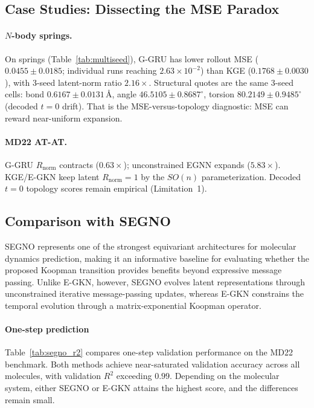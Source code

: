 \documentclass{article}
\newcommand{\GKE}{\textsc{KGE}}
\newcommand{\EGKN}{\textsc{E-GKN}}
\newcommand{\EGNN}{\textsc{EGNN}}
\newcommand{\GGRU}{\textsc{G-GRU}}
\begin{document}
\subsection{Case Studies: Dissecting the MSE Paradox}
\label{sec:mse_paradox}

\paragraph{$N$-body springs.} On springs (Table~\ref{tab:multiseed}), \GGRU{} has lower rollout MSE ($0.0455 \pm 0.0185$; individual runs reaching $2.63\times10^{-2}$) than \GKE{} ($0.1768 \pm 0.0030$), with 3-seed latent-norm ratio $2.16\times$. Structural quotes are the same 3-seed cells: bond $0.6167\pm 0.0131$\,\AA, angle $46.5105\pm 0.8687^\circ$, torsion $80.2149\pm 0.9485^\circ$ (decoded $t=0$ drift). That is the MSE-versus-topology diagnostic: MSE can reward near-uniform expansion.

\paragraph{MD22 AT-AT.} \GGRU{} $R_{\text{norm}}$ contracts ($0.63\times$); unconstrained \EGNN{} expands ($5.83\times$). \GKE{}/\EGKN{} keep latent $R_{\text{norm}}=1$ by the $SO(n)$ parameterization. Decoded $t=0$ topology scores remain empirical (Limitation~1).

\subsection{Comparison with SEGNO}

SEGNO represents one of the strongest equivariant architectures for molecular dynamics prediction, making it an informative baseline for evaluating whether the proposed Koopman transition provides benefits beyond expressive message passing. Unlike E-GKN, however, SEGNO evolves latent representations through unconstrained iterative message-passing updates, whereas E-GKN constrains the temporal evolution through a matrix-exponential Koopman operator.

\paragraph{One-step prediction}
Table~\ref{tab:segno_r2} compares one-step validation performance on the MD22 benchmark. Both methods achieve near-saturated validation accuracy across all molecules, with validation $R^2$ exceeding $0.99$. Depending on the molecular system, either SEGNO or E-GKN attains the highest score, and the differences remain small.
\end{document}
